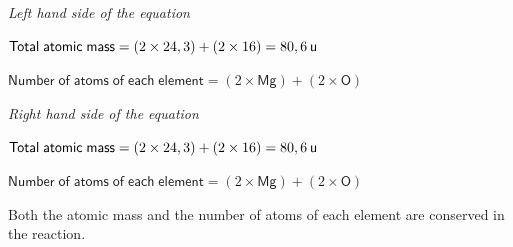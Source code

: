       \label{m38711*id64732}
        \textsl{Left hand side of the equation}
      \par 
      \label{m38711*id64739}$\mathsf{Total\; atomic\; mass}=\left(2\ensuremath{\times}24,3\right)+\left(2\ensuremath{\times}16\right)=80,6\phantom{\rule{2pt}{0ex}}\mathsf{u}$\par 
      \label{m38711*id64761}$\mathsf{Number\; of\; atoms\; of\; each\; element}=\left(2\ensuremath{\times}\mathsf{Mg}\right)+\left(2\ensuremath{\times}\mathsf{O}\right)$\par 
      \label{m38711*id64783}
        \textsl{Right hand side of the equation}
      \par 
      \label{m38711*id64790}$\mathsf{Total\; atomic\; mass}=\left(2\ensuremath{\times}24,3\right)+\left(2\ensuremath{\times}16\right)=80,6\phantom{\rule{2pt}{0ex}}\mathsf{u}$\par 
      \label{m38711*id64811}$\mathsf{Number\; of\; atoms\; of\; each\; element}=\left(2\ensuremath{\times}\mathsf{Mg}\right)+\left(2\ensuremath{\times}\mathsf{O}\right)$\par 
      \label{m38711*id64833}Both the atomic mass and the number of atoms of each element are conserved in the reaction.\par 
\label{m38711*secfhsst!!!underscore!!!id486}
